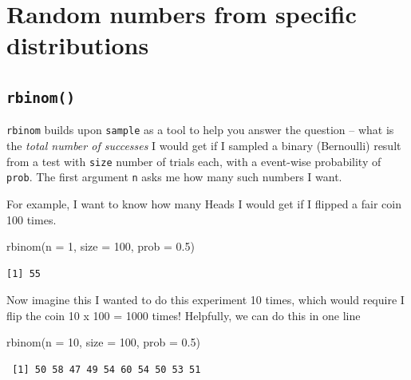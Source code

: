 \documentclass[
  letterpaper,
]{book}
\newenvironment{Shaded}{\begin{snugshade}}{\end{snugshade}}
\newcommand{\AttributeTok}[1]{\textcolor[rgb]{0.40,0.45,0.13}{#1}}
\newcommand{\DecValTok}[1]{\textcolor[rgb]{0.68,0.00,0.00}{#1}}
\newcommand{\FloatTok}[1]{\textcolor[rgb]{0.68,0.00,0.00}{#1}}
\newcommand{\FunctionTok}[1]{\textcolor[rgb]{0.28,0.35,0.67}{#1}}
\newcommand{\NormalTok}[1]{\textcolor[rgb]{0.00,0.23,0.31}{#1}}
\theoremstyle{definition}
\theoremstyle{definition}
\theoremstyle{plain}
\theoremstyle{definition}
\theoremstyle{plain}
\theoremstyle{plain}
\theoremstyle{remark}
\begin{document}
\hypertarget{random-numbers-from-specific-distributions}{%
\section{Random numbers from specific
distributions}\label{random-numbers-from-specific-distributions}}

\hypertarget{rbinom}{%
\subsection*{\texorpdfstring{\texttt{rbinom()}}{rbinom()}}\label{rbinom}}

\texttt{rbinom} builds upon \texttt{sample} as a tool to help you answer
the question -- what is the \emph{total number of successes} I would get
if I sampled a binary (Bernoulli) result from a test with \texttt{size}
number of trials each, with a event-wise probability of \texttt{prob}.
The first argument \texttt{n} asks me how many such numbers I want.

For example, I want to know how many Heads I would get if I flipped a
fair coin 100 times.

\begin{Shaded}
\begin{Highlighting}[]
\FunctionTok{rbinom}\NormalTok{(}\AttributeTok{n =} \DecValTok{1}\NormalTok{, }\AttributeTok{size =} \DecValTok{100}\NormalTok{, }\AttributeTok{prob =} \FloatTok{0.5}\NormalTok{)}
\end{Highlighting}
\end{Shaded}

\begin{verbatim}
[1] 55
\end{verbatim}

Now imagine this I wanted to do this experiment 10 times, which would
require I flip the coin 10 x 100 = 1000 times! Helpfully, we can do this
in one line

\begin{Shaded}
\begin{Highlighting}[]
\FunctionTok{rbinom}\NormalTok{(}\AttributeTok{n =} \DecValTok{10}\NormalTok{, }\AttributeTok{size =} \DecValTok{100}\NormalTok{, }\AttributeTok{prob =} \FloatTok{0.5}\NormalTok{)}
\end{Highlighting}
\end{Shaded}

\begin{verbatim}
 [1] 50 58 47 49 54 60 54 50 53 51
\end{verbatim}
\end{document}
